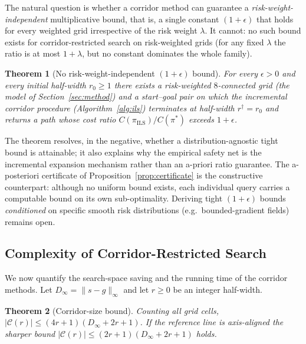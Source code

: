 \documentclass[preprint,12pt,authoryear]{elsarticle}
\newtheorem{theorem}{Theorem}
\begin{document}
The natural question is whether a corridor method can guarantee a \emph{risk-weight-independent} multiplicative bound, that is, a single constant $(1+\epsilon)$ that holds for every weighted grid irrespective of the risk weight $\lambda$. It cannot: no such bound exists for corridor-restricted search on risk-weighted grids (for any fixed $\lambda$ the ratio is at most $1+\lambda$, but no constant dominates the whole family).

\begin{theorem}[No risk-weight-independent $(1+\epsilon)$ bound]\label{thm:no_bound}
For every $\epsilon > 0$ and every initial half-width $r_0 \geq 1$ there exists a risk-weighted $8$-connected grid (the model of Section~\ref{sec:method}) and a start--goal pair on which the incremental corridor procedure (Algorithm~\ref{alg:ils}) terminates at half-width $r^{\dagger} = r_0$ and returns a path whose cost ratio $C(\pi_{\mathrm{ILS}})/C(\pi^*)$ exceeds $1 + \epsilon$.
\end{theorem}

The theorem resolves, in the negative, whether a distribution-agnostic tight bound is attainable; it also explains why the empirical safety net is the incremental expansion mechanism rather than an a-priori ratio guarantee. The a-posteriori certificate of Proposition~\ref{prop:certificate} is the constructive counterpart: although no uniform bound exists, each individual query carries a computable bound on its own sub-optimality.
Deriving tight $(1+\epsilon)$ bounds \emph{conditioned} on specific smooth risk distributions (e.g.\ bounded-gradient fields) remains open.

\subsection{Complexity of Corridor-Restricted Search}\label{subsec:complexity}

We now quantify the search-space saving and the running time of the corridor methods. Let $D_\infty = \|s - g\|_\infty$ and let $r \geq 0$ be an integer half-width.

\begin{theorem}[Corridor-size bound]\label{thm:size}
Counting all grid cells, $|\mathcal{C}(r)| \leq (4r+1)(D_\infty + 2r + 1)$. If the reference line is axis-aligned the sharper bound $|\mathcal{C}(r)| \leq (2r+1)(D_\infty + 2r + 1)$ holds.
\end{theorem}
\end{document}
